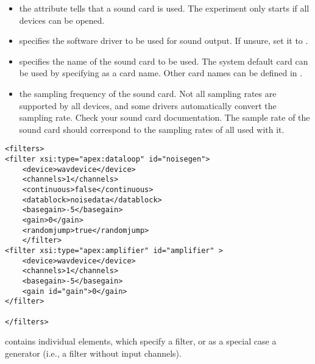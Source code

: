 \begin{itemize}
\item {} the 
attribute tells \apex that a sound card is used. The experiment
only starts if all devices can be opened.

\item {} specifies the software driver to be used
for sound output. If unsure, set it to .

\item {} specifies the name of the sound card to be
used. The system default card can be used by specifying
 as a card name. Other card names can be defined in
.

\item {} the sampling frequency of the sound
card. Not all sampling rates are supported by all devices, and
some drivers automatically convert the sampling rate. Check your
sound card documentation. The sample rate of the sound card should
correspond to the sampling rates of all  used
with it.
\end{itemize}

   
 

\begin{lstlisting}
<filters>
<filter xsi:type="apex:dataloop" id="noisegen">
    <device>wavdevice</device>
    <channels>1</channels>
    <continuous>false</continuous>
    <datablock>noisedata</datablock>
    <basegain>-5</basegain>
    <gain>0</gain>
    <randomjump>true</randomjump>
    </filter>
<filter xsi:type="apex:amplifier" id="amplifier" >
    <device>wavdevice</device>
    <channels>1</channels>
    <basegain>-5</basegain>
    <gain id="gain">0</gain>
</filter>

</filters>
\end{lstlisting}

 contains individual  elements,
which specify a filter, or as a special case a generator (i.e., a
filter without input channels).

